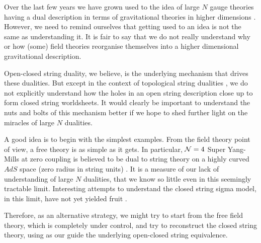 \vskip 0.5cm
\listtoc
\writetoc



Over the last few years we have grown used to the idea of large $N$
gauge theories 
having a dual description in terms of gravitational theories in higher
dimensions \malda\gkp\witads . However, we need to remind ourselves that 
getting used to an idea is not the same as understanding it. 
It is fair to say that we do not really understand why or how (some) 
field theories 
reorganise themselves into a higher dimensional gravitational description. 

Open-closed string duality, we believe, is the underlying mechanism that 
drives these dualities. But 
except in the context of topological string dualities \gv\ov , we do not
explicitly understand how the holes in an open string description close up to form
closed string worldsheets. It would clearly be important to understand the nuts and bolts
of this mechanism better if we hope to shed further light on the miracles of
large $N$ dualities. 
  
A good idea is to begin with the simplest examples. From the field theory point
of view, a free theory is as simple as it gets. In particular,  ${\cal N}=4$ Super 
Yang-Mills at zero 
coupling is believed to be dual to 
string theory on a highly curved $AdS$ space (zero radius in string units) \sund . It is a 
measure of our lack of understanding of large $N$ dualities, that we know so little even
in this seemingly tractable limit. Interesting attempts
to understand the closed string sigma model, in this limit, have not yet yielded fruit \dmw\karch\polch . 

Therefore, as an alternative strategy, 
we might try to start from the free field theory, which is completely under 
control, and try to reconstruct the closed string theory, using as our guide the underlying
open-closed string equivalence. 


